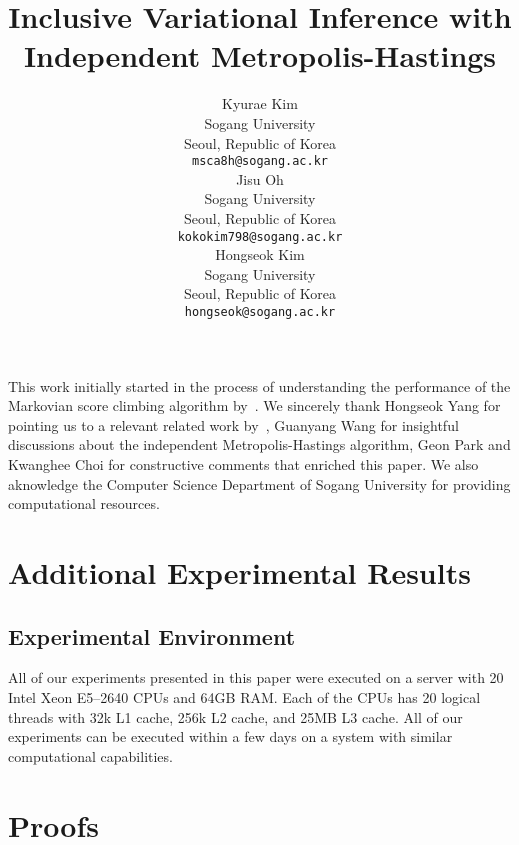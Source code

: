\documentclass{article}
\title{Inclusive Variational Inference with \\ Independent Metropolis-Hastings}
\author{%
  Kyurae Kim \\
  Sogang University\\
  Seoul, Republic of Korea \\
  \texttt{msca8h@sogang.ac.kr} \\
  \And
  Jisu Oh \\
  Sogang University\\
  Seoul, Republic of Korea \\
  \texttt{kokokim798@sogang.ac.kr} \\
  \And
  Hongseok Kim \\
  Sogang University\\
  Seoul, Republic of Korea \\
  \texttt{hongseok@sogang.ac.kr} \\
}
\begin{document}
\maketitle

\begin{abstract}
  
\end{abstract}







\newpage

\begin{ack}
  This work initially started in the process of understanding the performance of the Markovian score climbing algorithm by~\citet{NEURIPS2020_b2070693}.
  We sincerely thank Hongseok Yang for pointing us to a relevant related work by~\citet{kim2021adaptive}, Guanyang Wang for insightful discussions about the independent Metropolis-Hastings algorithm, Geon Park and Kwanghee Choi for constructive comments that enriched this paper.
  We also aknowledge the Computer Science Department of Sogang University for providing computational resources.
\end{ack}




\newpage
\appendix
\section{Additional Experimental Results}
\subsection{Experimental Environment}\label{section:resources}
All of our experiments presented in this paper were executed on a server with 20 Intel Xeon E5--2640 CPUs and 64GB RAM.
Each of the CPUs has 20 logical threads with 32k L1 cache, 256k L2 cache, and 25MB L3 cache.
All of our experiments can be executed within a few days on a system with similar computational capabilities.





\section{Proofs}

\printProofs
\end{document}
